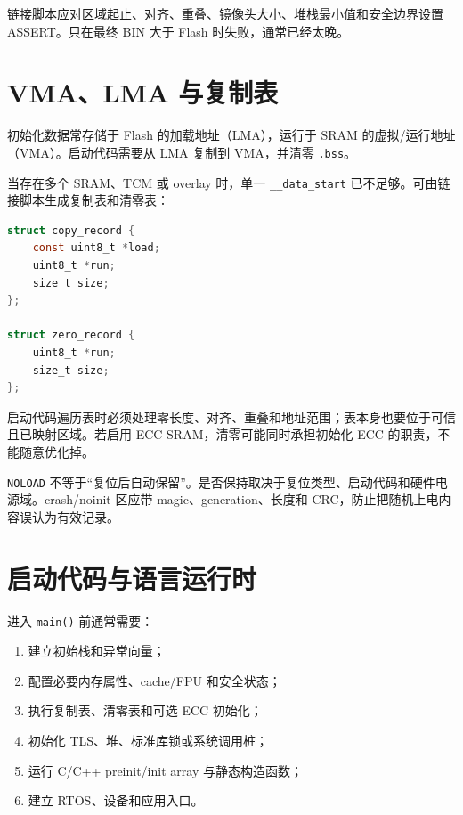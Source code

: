 链接脚本应对区域起止、对齐、重叠、镜像头大小、堆栈最小值和安全边界设置 ASSERT。只在最终 BIN 大于 Flash 时失败，通常已经太晚。

\section{VMA、LMA 与复制表}

初始化数据常存储于 Flash 的加载地址（LMA），运行于 SRAM 的虚拟/运行地址（VMA）。启动代码需要从 LMA 复制到 VMA，并清零 \texttt{.bss}。

当存在多个 SRAM、TCM 或 overlay 时，单一 \texttt{\_\_data\_start} 已不足够。可由链接脚本生成复制表和清零表：

\begin{minipage}{\linewidth}
\begin{lstlisting}[language=C,caption={启动复制表的逻辑结构}]
struct copy_record {
    const uint8_t *load;
    uint8_t *run;
    size_t size;
};

struct zero_record {
    uint8_t *run;
    size_t size;
};
\end{lstlisting}
\end{minipage}

启动代码遍历表时必须处理零长度、对齐、重叠和地址范围；表本身也要位于可信且已映射区域。若启用 ECC SRAM，清零可能同时承担初始化 ECC 的职责，不能随意优化掉。

\texttt{NOLOAD} 不等于“复位后自动保留”。是否保持取决于复位类型、启动代码和硬件电源域。crash/noinit 区应带 magic、generation、长度和 CRC，防止把随机上电内容误认为有效记录。

\section{启动代码与语言运行时}

进入 \texttt{main()} 前通常需要：

\begin{enumerate}
  \item 建立初始栈和异常向量；
  \item 配置必要内存属性、cache/FPU 和安全状态；
  \item 执行复制表、清零表和可选 ECC 初始化；
  \item 初始化 TLS、堆、标准库锁或系统调用桩；
  \item 运行 C/C++ preinit/init array 与静态构造函数；
  \item 建立 RTOS、设备和应用入口。
\end{enumerate}

